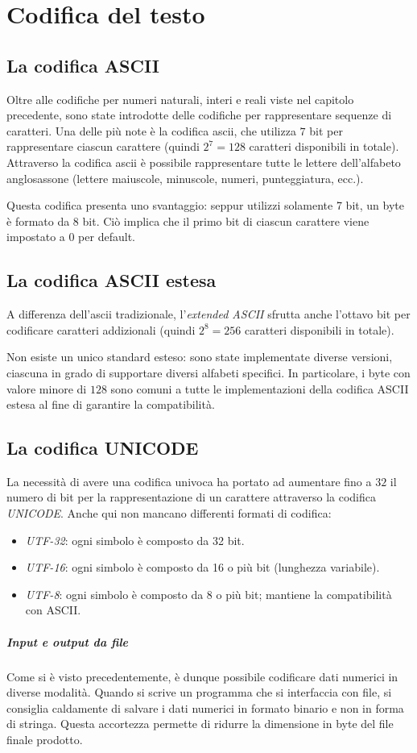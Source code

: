 \documentclass[class=book, crop=false, oneside]{standalone}
\begin{document}
\chapter{Codifica del testo}
\section{La codifica ASCII}
Oltre alle codifiche per numeri naturali, interi e reali viste nel capitolo precedente, sono state introdotte delle codifiche per rappresentare sequenze di caratteri. Una delle più note è la codifica \acrfull{ascii}, che utilizza \(7\) bit per rappresentare ciascun carattere (quindi \(2^7=128\) caratteri disponibili in totale).
Attraverso la codifica \acrshort{ascii} è possibile rappresentare tutte le lettere dell'alfabeto anglosassone (lettere maiuscole, minuscole, numeri, punteggiatura, ecc.).

Questa codifica presenta uno svantaggio: seppur utilizzi solamente 7 bit, un byte è formato da 8 bit. Ciò implica che il primo bit di ciascun carattere viene impostato a 0 per default.

\section{La codifica ASCII estesa}
A differenza dell'\acrshort{ascii} tradizionale, l'\emph{extended ASCII} sfrutta anche l'ottavo bit per codificare caratteri addizionali (quindi \(2^8=256\) caratteri disponibili in totale).

Non esiste un unico standard esteso: sono state implementate diverse versioni, ciascuna in grado di supportare diversi alfabeti specifici. In particolare, i byte con valore minore di \(128\) sono comuni a tutte le implementazioni della codifica ASCII estesa al fine di garantire la compatibilità.

\section{La codifica UNICODE}
La necessità di avere una codifica univoca ha portato ad aumentare fino a \(32\) il numero di bit per la rappresentazione di un carattere attraverso la codifica \emph{UNICODE}. Anche qui non mancano differenti formati di codifica:
\begin{itemize}[noitemsep]
	\item \emph{UTF-32}: ogni simbolo è composto da 32 bit.
	\item \emph{UTF-16}: ogni simbolo è composto da 16 o più bit (lunghezza variabile).
	\item \emph{UTF-8}: ogni simbolo è composto da 8 o più bit; mantiene la compatibilità con ASCII.
\end{itemize}

\paragraph*{Input e output da file}
Come si è visto precedentemente, è dunque possibile codificare dati numerici in diverse modalità. Quando si scrive un programma che si interfaccia con file, si consiglia caldamente di salvare i dati numerici in formato binario e non in forma di stringa. Questa accortezza permette di ridurre la dimensione in byte del file finale prodotto.
\end{document}
